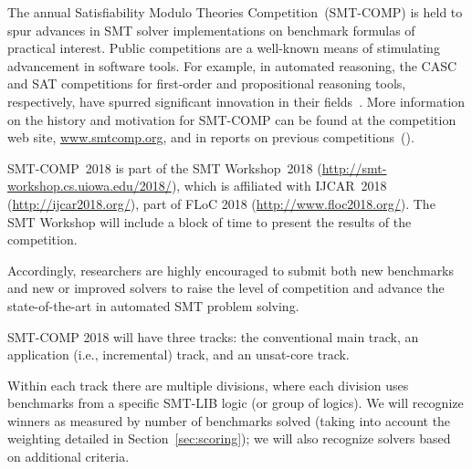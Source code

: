 \documentclass[12pt]{article}
\begin{document}
The annual Satisfiability Modulo Theories Competition~(SMT-COMP) is
held to spur advances in SMT solver implementations on benchmark
formulas of practical interest.  Public competitions are a well-known
means of stimulating advancement in software tools.  For example, in
automated reasoning, the CASC and SAT competitions for first-order and
propositional reasoning tools, respectively, have spurred significant
innovation in their fields~\cite{leberre+03,PSS02}.  More information
on the history and motivation for SMT-COMP can be found at the
competition web site, \url{www.smtcomp.org}, and in reports on
previous
competitions~(\cite{SMTCOMP-JAR,SMTCOMP-FMSD,BDOS08,SMTCOMP-2008,CDW14,SMTCOMP-2012,CSW15}).

SMT-COMP~2018 is part of the SMT Workshop~2018
(\url{http://smt-workshop.cs.uiowa.edu/2018/}),
which is affiliated with IJCAR~2018 (\url{http://ijcar2018.org/}),
part of FLoC 2018 (\url{http://www.floc2018.org/}).
The SMT Workshop will include a block of time to present the results of the
competition.

Accordingly, researchers are highly encouraged to submit both new
benchmarks and new or improved solvers to raise the level of
competition and advance the state-of-the-art in automated SMT problem
solving.

SMT-COMP 2018 will have three tracks: the conventional main track, an
application (i.e., incremental) track, and an unsat-core track.

Within each track there are multiple divisions, where each division
uses benchmarks from a specific SMT-LIB logic (or group of logics).
We will recognize winners as measured by number of benchmarks solved
(taking into account the weighting detailed in
Section~\ref{sec:scoring}); we will also recognize solvers based on
additional criteria.
\end{document}

